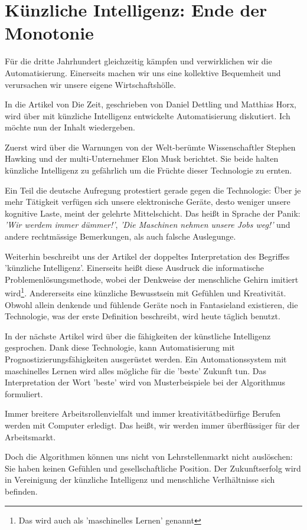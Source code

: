 \documentclass[../Mappe.tex]{subfiles}
\begin{document}
\section{Künzliche Intelligenz: Ende der Monotonie}

Für die dritte Jahrhundert gleichzeitig kämpfen und verwirklichen wir die Automatisierung.
Einerseits machen wir uns eine kollektive Bequemheit und verursachen wir unsere eigene Wirtschaftshölle.

In die Artikel von Die Zeit, geschrieben von Daniel Dettling und Matthias Horx, wird über mit künzliche Intelligenz
entwickelte Automatisierung diskutiert.
Ich möchte nun der Inhalt wiedergeben.

Zuerst wird über die Warnungen von der Welt-berümte Wissenschaftler Stephen Hawking und der multi-Unternehmer Elon Musk berichtet.
Sie beide halten künzliche Intelligenz zu gefährlich um die Früchte dieser Technologie zu ernten.

Ein Teil die deutsche Aufregung protestiert gerade gegen die Technologie: 
Über je mehr Tätigkeit verfügen sich unsere elektronische Geräte, desto weniger unsere kognitive Laste, meint der gelehrte Mittelschicht.
Das heißt in Sprache der Panik: \emph{'Wir werdem immer dümmer!'}, \emph{'Die Maschinen nehmen unsere Jobs weg!'}
und andere rechtmässige Bemerkungen, als auch falsche Auslegunge.

Weiterhin beschreibt uns der Artikel der doppeltes Interpretation des Begriffes 'künzliche Intelligenz'.
Einerseits heißt diese Ausdruck die informatische Problemenlösungsmethode, wobei der Denkweise der menschliche Gehirn imitiert wird\footnote{Das wird auch als 'maschinelles Lernen' genannt}.
Andererseits eine künzliche Bewusstsein mit Gefühlen und Kreativität.
Obwohl allein denkende und fühlende Geräte noch in Fantasieland existieren, die Technologie, was der erste Definition beschreibt, wird heute täglich benutzt. 

In der nächste Artikel wird über die fähigkeiten der künstliche Intelligenz gesprochen.
Dank diese Technologie, kann Automatisierung mit Prognostizierungsfähigkeiten ausgerüstet werden.
Ein Automationssystem mit maschinelles Lernen wird alles mögliche für die 'beste' Zukunft tun.
Das Interpretation der Wort 'beste' wird von Musterbeispiele bei der Algorithmus formuliert.

Immer breitere Arbeitsrollenvielfalt und immer kreativitätbedürfige Berufen werden mit Computer erledigt.
Das heißt, wir werden immer überflüssiger für der Arbeitsmarkt.

Doch die Algorithmen können uns nicht von Lehrstellenmarkt nicht auslöschen:
Sie haben keinen Gefühlen und gesellschaftliche Position.
Der Zukunftserfolg wird in Vereinigung der künzliche Intelligenz und menschliche Verlhältnisse sich befinden.
\end{document}
